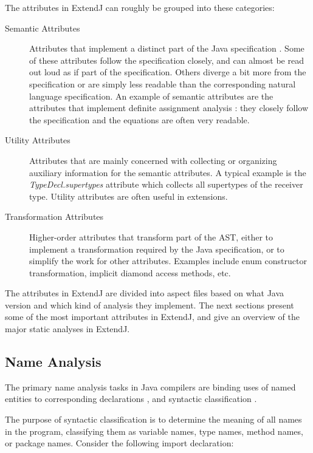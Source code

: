 \documentclass[10pt, twoside, openright]{book}
\begin{document}
The attributes in ExtendJ can roughly be grouped into these categories:

\begin{description}
  \item[Semantic Attributes] Attributes that implement a distinct part of the Java
    specification \cite{jls7}.
    Some of these attributes follow the specification closely, and can almost be read out loud
    as if part of the specification. Others diverge a bit more from the specification or
    are simply less readable than the corresponding natural language specification.
    An example of semantic attributes are the attributes that implement definite assignment
    analysis \cite[\S 16]{jls7}:
    they closely follow the specification and the equations are often very
    readable.
  \item[Utility Attributes] Attributes that are mainly concerned with collecting or organizing
    auxiliary information for the semantic attributes.
    A typical example is the \emph{TypeDecl.supertypes} attribute which
    collects all supertypes of the receiver type. Utility attributes are often useful in extensions.
  \item[Transformation Attributes] Higher-order attributes that transform
    part of the AST, either to implement a transformation required by the Java specification,
    or to simplify the work for other attributes.
    Examples include enum constructor transformation, implicit diamond access methods,
    etc.
\end{description}

The attributes in ExtendJ are divided into aspect files based on what Java version and which
kind of analysis they implement.
The next sections present some of the most important attributes in ExtendJ, and give
an overview of the major static analyses in ExtendJ.

\subsection{Name Analysis}
\label{sec:exj-name-analysis}

The primary name analysis tasks in Java compilers are binding uses of named entities
to corresponding declarations \cite[\S 6]{jls7}, and syntactic classification
\cite[\S 6.5.1]{jls7}.

The purpose of syntactic classification is to determine the meaning of all names in
the program, classifying them as variable names, type names, method names, or package names.
Consider the following import declaration:
\end{document}
